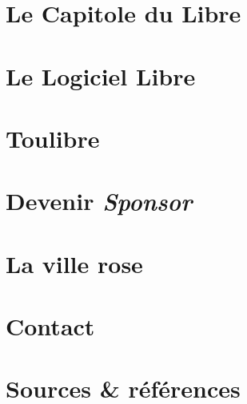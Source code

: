 \documentclass{cdl_sponsor}
\begin{document}

\section{Le Capitole du Libre}

	

\section{Le Logiciel Libre}

	

\section{Toulibre}

	

\section{Devenir \textit{Sponsor}}

	

\section{La ville rose}

	
	
\section{Contact}

	

\section{Sources \& références}

	
\end{document}
